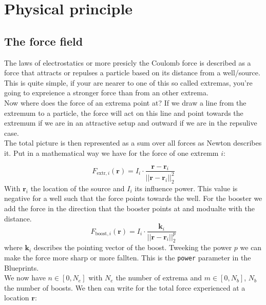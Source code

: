 \documentclass[../main.tex]{subfile}
\begin{document}
\section{Physical principle}
\subsection{The force field}
    The laws of electrostatics or more presicly the Coulomb force is described as a force that attracts or repulses a 
    particle based on its distance from a well/source. This is quite simple, if your are nearer to one of this so called
    extremas, you're going to expreience a stronger force than from an other extrema.\\

    Now where does the force of an extrema point at? If we draw a line from the extremum to a particle,
    the force will act on this line and point towards the extremum if we are in an attractive setup and outward if we are in
    the repsulive case.\\

    The total picture is then represented as a sum over all forces as Newton describes it. Put in a mathematical way we have for the force of one extremm $i$:

    \begin{equation}
        F_{\text{extr},i}(\bm{r}) = I_i\cdot\frac{\bm{r}-\bm{r}_i}{||\bm{r}-\bm{r}_i||_2^2} 
    \end{equation}
    With $\bm{r}_i$ the location of the source and $I_i$ its influence power. This value is negative for a well such that the force
    points towards the well.
    For the booster we add the force in the direction that the booster points at and modualte with the distance.
    \begin{equation}
        F_{\text{boost},i}(\bm{r}) = I_i\cdot\frac{\bm{k}_i}{||\bm{r}-\bm{r}_i||_2^p} 
    \end{equation}
    where $\bm{k}_i$ describes the pointing vector of the boost. Tweeking the power $p$ we can make the force more sharp or more fallten. This is the \texttt{power} 
    parameter in the Blueprints.\\
     We now have $n\in[0,N_e]$ with $N_e$ the number of extrema and
    $m\in[0,N_b]$, $N_b$ the number of boosts. We then can write for the total force experienced at a location $\bm{r}$:
\end{document}

